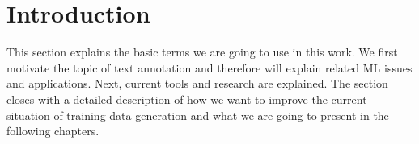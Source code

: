 \section{Introduction}
	This section explains the basic terms we are going to use in this work. We first motivate the topic of text annotation and therefore will explain related \acf{ML} issues and applications. Next, current tools and research are explained. The section closes with a detailed description of how we want to improve the current situation of training data generation and what we are going to present in the following chapters.

	
	
	
